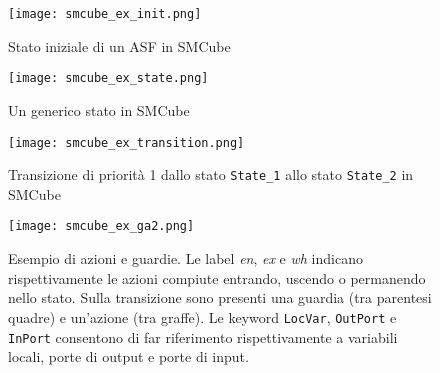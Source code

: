\begin{figure}
\centering
\texttt{[image: smcube\_ex\_init.png]}
\caption{Stato iniziale di un ASF in SMCube}
\label{Fig:smcube_ex_init}
\end{figure}

\begin{figure}
\centering
\texttt{[image: smcube\_ex\_state.png]}
\caption{Un generico stato in SMCube}
\label{Fig:smcube_ex_state}
\end{figure}

\begin{figure}
\centering
\texttt{[image: smcube\_ex\_transition.png]}
\caption{Transizione di priorità 1 dallo stato \texttt{State\_1} allo stato \texttt{State\_2} in SMCube}
\label{Fig:smcube_ex_transition}
\end{figure}

\begin{figure}
\centering
\texttt{[image: smcube\_ex\_ga2.png]}
\caption{Esempio di azioni e guardie. Le label \textit{en}, \textit{ex} e \textit{wh} indicano rispettivamente le azioni compiute entrando, uscendo o permanendo nello stato. Sulla transizione sono presenti una guardia (tra parentesi quadre) e un'azione (tra graffe). Le keyword \texttt{LocVar}, \texttt{OutPort} e \texttt{InPort} consentono di far riferimento rispettivamente a variabili locali, porte di output e porte di input.}
\label{Fig:smcube_ex_ga}
\end{figure}